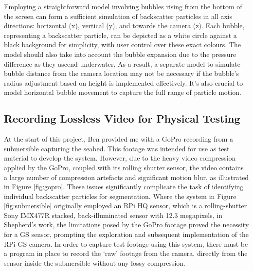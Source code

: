 Employing a straightforward model involving bubbles rising from the bottom of the screen can form a sufficient simulation of backscatter particles in all axis directions: horizontal (x), vertical (y), and towards the camera (z). Each bubble, representing a backscatter particle, can be depicted as a white circle against a black background for simplicity, with user control over these exact colours. The model should also take into account the bubble expansion due to the pressure difference as they ascend underwater. As a result, a separate model to simulate bubble distance from the camera location may not be necessary if the bubble's radius adjustment based on height is implemented effectively. It's also crucial to model horizontal bubble movement to capture the full range of particle motion.

\subsection{Recording Lossless Video for Physical Testing}
\label{designrec}

At the start of this project, Ben provided me with a GoPro recording from a submersible capturing the seabed. This footage was intended for use as test material to develop the system. However, due to the heavy video compression applied by the GoPro, coupled with its rolling shutter sensor, the video contains a large number of compression artefacts and significant motion blur, as illustrated in Figure \ref{fig:gopro}. These issues significantly complicate the task of identifying individual backscatter particles for segmentation. Where the system in Figure \ref{fig:submersible} originally employed an RPi HQ sensor, which is a rolling-shutter Sony IMX477R stacked, back-illuminated sensor with 12.3 megapixels, in Shepherd's work, the limitations posed by the GoPro footage proved the necessity for a GS sensor, prompting the exploration and subsequent implementation of the RPi GS camera. In order to capture test footage using this system, there must be a program in place to record the `raw' footage from the camera, directly from the sensor inside the submersible without any lossy compression.

